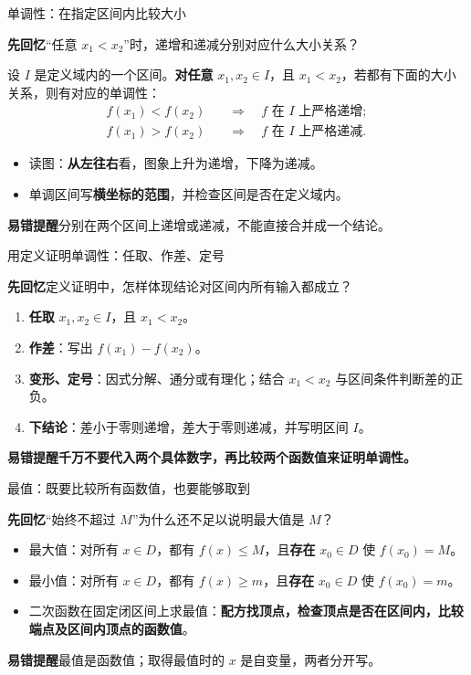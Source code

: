 \documentclass[UTF8,10pt,aspectratio=169,handout]{ctexbeamer}
\newcommand{\Recall}[1]{\par\noindent\textcolor{KnowledgeBlue}{\textbf{先回忆}\quad #1}\par\vspace{0.3cm}}
\newcommand{\Pitfall}[1]{\par\vspace{0.22cm}\noindent\textbf{易错提醒}\quad #1\par}
\begin{document}
\begin{frame}[t]{单调性：在指定区间内比较大小}
\large
\Recall{“任意 $x_1<x_2$”时，递增和递减分别对应什么大小关系？}
\pause
设 $I$ 是定义域内的一个区间。\textbf{对任意} $x_1,x_2\in I$，且 $x_1<x_2$，若都有下面的大小关系，则有对应的单调性：
\[
\begin{aligned}
 f(x_1)<f(x_2)&\quad\Longrightarrow\quad f\text{ 在 }I\text{ 上严格递增};\\[0.25em]
 f(x_1)>f(x_2)&\quad\Longrightarrow\quad f\text{ 在 }I\text{ 上严格递减}.
\end{aligned}
\]
\begin{itemize}
  \item 读图：\textbf{从左往右}看，图象上升为递增，下降为递减。
  \item 单调区间写\textbf{横坐标的范围}，并检查区间是否在定义域内。
\end{itemize}
\Pitfall{分别在两个区间上递增或递减，不能直接合并成一个结论。}
\end{frame}

\begin{frame}[t]{用定义证明单调性：任取、作差、定号}
\large
\Recall{定义证明中，怎样体现结论对区间内所有输入都成立？}
\pause
\begin{enumerate}
  \item \textbf{任取} $x_1,x_2\in I$，且 $x_1<x_2$。
  \item \textbf{作差}：写出 $f(x_1)-f(x_2)$。
  \item \textbf{变形、定号}：因式分解、通分或有理化；结合 $x_1<x_2$ 与区间条件判断差的正负。
  \item \textbf{下结论}：差小于零则递增，差大于零则递减，并写明区间 $I$。
\end{enumerate}
\Pitfall{\textbf{千万不要代入两个具体数字，再比较两个函数值来证明单调性。}}
\end{frame}

\begin{frame}[t]{最值：既要比较所有函数值，也要能够取到}
\large
\Recall{“始终不超过 $M$”为什么还不足以说明最大值是 $M$？}
\pause
\begin{itemize}
  \item 最大值：对所有 $x\in D$，都有 $f(x)\le M$，且\textbf{存在} $x_0\in D$ 使 $f(x_0)=M$。
  \item 最小值：对所有 $x\in D$，都有 $f(x)\ge m$，且\textbf{存在} $x_0\in D$ 使 $f(x_0)=m$。
  \item 二次函数在固定闭区间上求最值：\textbf{配方找顶点，检查顶点是否在区间内，比较端点及区间内顶点的函数值}。
\end{itemize}
\Pitfall{最值是函数值；取得最值时的 $x$ 是自变量，两者分开写。}
\end{frame}
\end{document}
